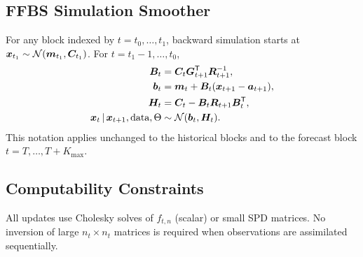 \subsection{FFBS Simulation Smoother}
For any block indexed by $t=t_0,\dots,t_1$, backward simulation starts at
$\bm x_{t_1}\sim\mathcal{N}(\bm m_{t_1},\bm C_{t_1})$.
For $t=t_1-1,\dots,t_0$,
\begin{align}
\bm B_t &= \bm C_t\bm G_{t+1}^{\mathsf{T}}\bm R_{t+1}^{-1}, \label{eq:ffbs_B}\\
\bm b_t &= \bm m_t + \bm B_t(\bm x_{t+1}-\bm a_{t+1}), \label{eq:ffbs_b}\\
\bm H_t &= \bm C_t - \bm B_t\bm R_{t+1}\bm B_t^{\mathsf{T}}, \label{eq:ffbs_H}\\
\bm x_t\,|\,\bm x_{t+1},\text{data},\Theta &\sim \mathcal{N}(\bm b_t,\bm H_t). \label{eq:ffbs_cond}
\end{align}
This notation applies unchanged to the historical blocks and to the forecast block
$t=T,\dots,T+K_{\max}$.

\subsection{Computability Constraints}
All updates use Cholesky solves of $f_{t,n}$ (scalar) or small SPD matrices.
No inversion of large $n_t\times n_t$ matrices is required when observations are assimilated sequentially.

